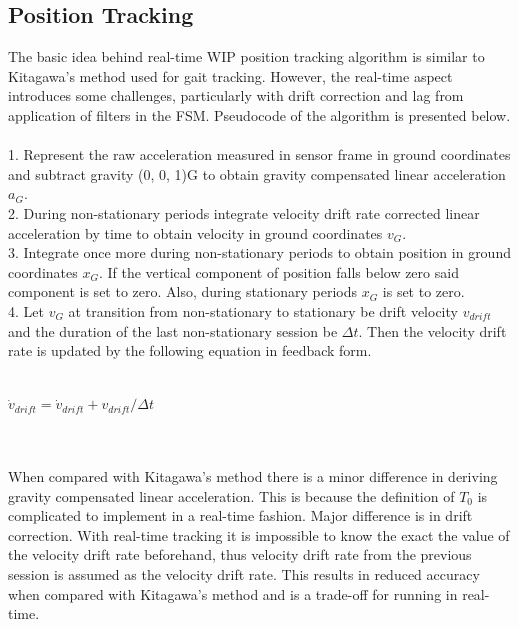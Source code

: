 \subsection{Position Tracking}
The basic idea behind real-time WIP position tracking algorithm is similar to Kitagawa's method used for gait tracking. However, the real-time aspect introduces some challenges, particularly with drift correction and lag from application of filters in the FSM. Pseudocode of the algorithm is presented below.
\\\\
1. Represent the raw acceleration measured in sensor frame in ground coordinates and subtract gravity (0, 0, 1)G to obtain gravity compensated linear acceleration $a_{G}$.\\
2. During non-stationary periods integrate velocity drift rate corrected linear acceleration by time to obtain velocity in ground coordinates $v_{G}$.\\
3. Integrate once more during non-stationary periods to obtain position in ground coordinates $x_{G}$. If the vertical component of position falls below zero said component is set to zero. Also, during stationary periods $x_{G}$ is set to zero.\\
4. Let $v_{G}$ at transition from non-stationary to stationary be drift velocity $v_{drift}$ and the duration of the last non-stationary session be $\Delta t$. Then the velocity drift rate is updated by the following equation in feedback form.\\\\
\centerline{$\dot{v}_{drift} = \dot{v}_{drift} + v_{drift}/\Delta t$}
\\\\
When compared with Kitagawa's method there is a minor difference in deriving gravity compensated linear acceleration. This is because the definition of $T_{0}$ is complicated to implement in a real-time fashion. Major difference is in drift correction. With real-time tracking it is impossible to know the exact the value of the velocity drift rate beforehand, thus velocity drift rate from the previous session is assumed as the velocity drift rate. This results in reduced accuracy when compared with Kitagawa's method and is a trade-off for running in real-time.


